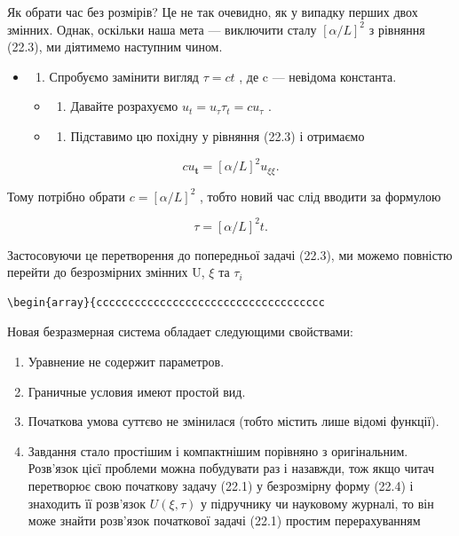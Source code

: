 \documentclass[
  ukrainian,
]{article}
\providecommand{\tightlist}{%
  \setlength{\itemsep}{0pt}\setlength{\parskip}{0pt}}
\begin{document}
Як обрати час без розмірів? Це не так очевидно, як у випадку перших двох
змінних. Однак, оскільки наша мета --- виключити сталу \([\alpha/L]^2\)
з рівняння (22.3), ми діятимемо наступним чином.

\begin{itemize}
\item
  \begin{enumerate}
  \def\labelenumi{\arabic{enumi}.}
  \tightlist
  \item
    Спробуємо замінити вигляд \(\tau = ct\) , де c --- невідома
    константа.
  \end{enumerate}

  \begin{itemize}
  \tightlist
  \item
    \begin{enumerate}
    \def\labelenumi{\arabic{enumi}.}
    \setcounter{enumi}{1}
    \tightlist
    \item
      Давайте розрахуємо \(u_t = u_{\tau} \tau_t = c u_{\tau}\) .
    \end{enumerate}
  \item
    \begin{enumerate}
    \def\labelenumi{\arabic{enumi}.}
    \setcounter{enumi}{2}
    \tightlist
    \item
      Підставимо цю похідну у рівняння (22.3) і отримаємо
    \end{enumerate}
  \end{itemize}
\end{itemize}

\[
cu_{\mathbf{t}} = [\alpha/L]^2 u_{\xi\xi}.
\]

Тому потрібно обрати \(c = [\alpha/L]^2\) , тобто новий час слід вводити
за формулою

\[
\tau = [\alpha/L]^2 t.
\]

Застосовуючи це перетворення до попередньої задачі (22.3), ми можемо
повністю перейти до безрозмірних змінних U, \(\xi\) та \(\tau_i\)

\begin{verbatim}
\begin{array}{cccccccccccccccccccccccccccccccccccc
\end{verbatim}

Новая безразмерная система обладает следующими свойствами:

\begin{enumerate}
\def\labelenumi{\arabic{enumi}.}
\item
  Уравнение не содержит параметров.
\item
  Граничные условия имеют простой вид.
\item
  Початкова умова суттєво не змінилася (тобто містить лише відомі
  функції).
\item
  Завдання стало простішим і компактнішим порівняно з оригінальним.
  Розв'язок цієї проблеми можна побудувати раз і назавжди, тож якщо
  читач перетворює свою початкову задачу (22.1) у безрозмірну форму
  (22.4) і знаходить її розв'язок \(U(\xi, \tau)\) у підручнику чи
  науковому журналі, то він може знайти розв'язок початкової задачі
  (22.1) простим перерахуванням
\end{enumerate}
\end{document}

